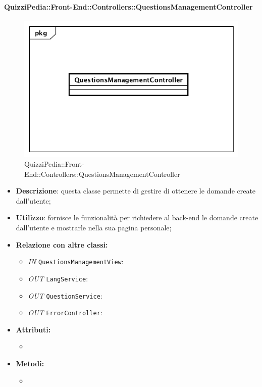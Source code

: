 \paragraph{QuizziPedia::Front-End::Controllers::QuestionsManagementController}
\begin{figure}
	\centering
	\includegraphics[scale=0.45]{UML/Classi/Front-End/QuizziPedia_Front-end_Controller_QuestionsManagementController.png}
	\caption{QuizziPedia::Front-End::Controllers::QuestionsManagementController}
\end{figure}
\begin{itemize}
	\item \textbf{Descrizione}: questa classe permette di gestire di ottenere le domande create dall'utente;
	\item \textbf{Utilizzo}: fornisce le funzionalità per richiedere al back-end le domande create dall'utente e mostrarle nella sua pagina personale; 
	\item \textbf{Relazione con altre classi:}
	\begin{itemize}
		\item \textit{IN} \texttt{QuestionsManagementView}:  
		\item \textit{OUT} \texttt{LangService}:
		\item \textit{OUT} \texttt{QuestionService}: 
		\item \textit{OUT} \texttt{ErrorController}: 
	\end{itemize}
	\item \textbf{Attributi:}
	\begin{itemize}
		\item 
	\end{itemize}
	\item \textbf{Metodi:}
	\begin{itemize}
		\item 
	\end{itemize}
\end{itemize}


